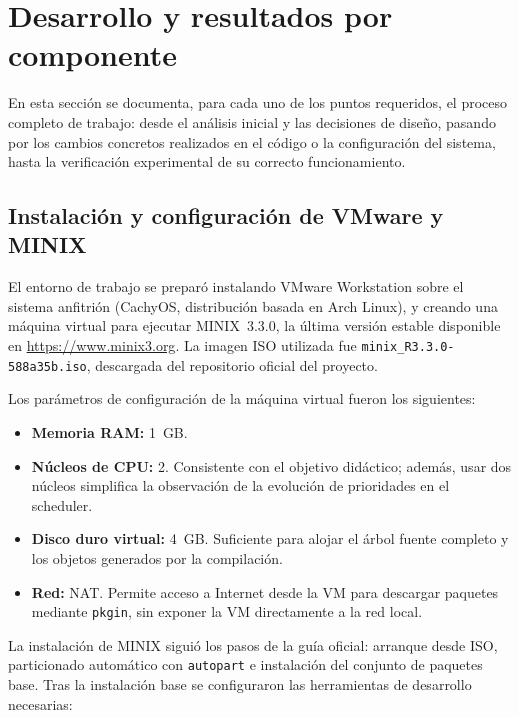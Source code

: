 \documentclass[11pt,a4paper]{article}
\begin{document}
\section{Desarrollo y resultados por componente}

En esta secci\'on se documenta, para cada uno de los puntos requeridos, el proceso completo de trabajo: desde el an\'alisis inicial y las decisiones de dise\~no, pasando por los cambios concretos realizados en el c\'odigo o la configuraci\'on del sistema, hasta la verificaci\'on experimental de su correcto funcionamiento.

\subsection{Instalaci\'on y configuraci\'on de VMware y MINIX}

El entorno de trabajo se prepar\'o instalando VMware Workstation sobre el sistema anfitri\'on (CachyOS, distribuci\'on basada en Arch Linux), y creando una m\'aquina virtual para ejecutar MINIX~3.3.0, la \'ultima versi\'on estable disponible en \url{https://www.minix3.org}. La imagen ISO utilizada fue \texttt{minix\_R3.3.0-588a35b.iso}, descargada del repositorio oficial del proyecto.

Los par\'ametros de configuraci\'on de la m\'aquina virtual fueron los siguientes:
\begin{itemize}[leftmargin=*]
  \item \textbf{Memoria RAM:} 1~GB.
  \item \textbf{N\'ucleos de CPU:} 2. Consistente con el objetivo did\'actico; adem\'as, usar dos n\'ucleos simplifica la observaci\'on de la evoluci\'on de prioridades en el scheduler.
  \item \textbf{Disco duro virtual:} 4~GB. Suficiente para alojar el \'arbol fuente completo y los objetos generados por la compilaci\'on.
  \item \textbf{Red:} NAT. Permite acceso a Internet desde la VM para descargar paquetes mediante \texttt{pkgin}, sin exponer la VM directamente a la red local.
\end{itemize}

La instalaci\'on de MINIX sigui\'o los pasos de la gu\'ia oficial: arranque desde ISO, particionado autom\'atico con \texttt{autopart} e instalaci\'on del conjunto de paquetes base. Tras la instalaci\'on base se configuraron las herramientas de desarrollo necesarias:
\end{document}
